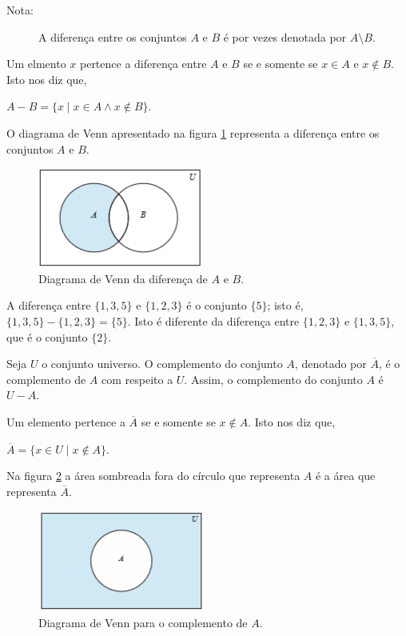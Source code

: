 \begin{description}
\item[Nota:] A diferença entre os conjuntos $A$ e $B$ é por vezes denotada por
$A\setminus B$.
\end{description}

Um elmento $x$ pertence a diferença entre $A$ e $B$ se e somente se $x \in A$ e
$x \notin B$. Isto nos diz que,
\begin{center}
$A - B = \{x \mid x \in A \land x \notin B\}$.
\end{center}

O diagrama de Venn apresentado na figura \ref{fig33} representa a diferença
entre os conjuntos $A$ e $B$.

\begin{figure}[H]
	\centering
	\includegraphics[scale=2]{chapter/imagens/33}
	\caption{Diagrama de Venn da diferença de $A$ e $B$.}
	\label{fig33}
\end{figure}

\begin{exmp}
\label{exem318}
A diferença entre $\{1,3,5\}$ e $\{1,2,3\}$ é o conjunto $\{5\}$; isto é,
$\{1,3,5\}-\{1,2,3\} = \{5\}$. Isto é diferente da diferença entre $\{1,2,3\}$ e
$\{1,3,5\}$, que é o conjunto $\{2\}$.
\end{exmp}

\begin{defn}
\label{def314}
Seja $U$ o conjunto universo. O complemento do conjunto $A$, denotado por
$\overline{A}$, é o complemento de $A$ com respeito a $U$. Assim, o complemento
do conjunto $A$ é $U - A$.
\end{defn}

Um elemento pertence a $\overline{A}$ se e somente se $x \notin A$. Isto nos diz
que,
\begin{center}
$\overline{A} = \{x \in U \mid x \notin A\}$.
\end{center}

Na figura \ref{fig34} a área sombreada fora do círculo que representa $A$ é a
área que representa $\overline{A}$.

\begin{figure}[H]
	\centering
	\includegraphics[scale=2]{chapter/imagens/34}
	\caption{Diagrama de Venn para o complemento de $A$.}
	\label{fig34}
\end{figure}


